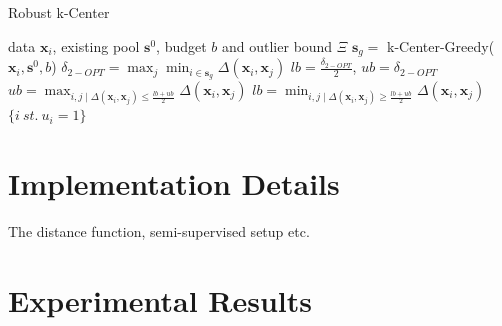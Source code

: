 \documentclass{article}
\begin{document}
\begin{algorithm}[tb]
   \caption{Robust k-Center}
   \label{alg:bin}
\begin{algorithmic}
    data $\mathbf{x}_i$, existing pool $\mathbf{s}^0$, budget $b$ and outlier bound $\Xi$
    $\mathbf{s}_g =$ k-Center-Greedy($\mathbf{x}_i, \mathbf{s}^0, b$)
   \STATE $\delta_{2-OPT} = \max_j \min_{i \in \mathbf{s}_g} \Delta(\mathbf{x}_i,\mathbf{x}_j)$ 
   \STATE $lb=\frac{\delta_{2-OPT}}{2}$, $ub=\delta_{2-OPT}$
   \REPEAT
   \STATE $ub=\max_{i,j \mid  \Delta(\mathbf{x}_i,\mathbf{x}_j) \leq \frac{lb+ub}{2}}  \Delta(\mathbf{x}_i,\mathbf{x}_j) $
   \ELSE
   \STATE $lb=\min_{i,j \mid   \Delta(\mathbf{x}_i,\mathbf{x}_j) \geq \frac{lb+ub}{2}}  \Delta(\mathbf{x}_i,\mathbf{x}_j) $
    \ENDIF
       $\{i\ st.\ u_i=1\}$
\end{algorithmic}
\end{algorithm}
\section{Implementation Details}
The distance function, semi-supervised setup etc.

\section{Experimental Results}
\end{document}
